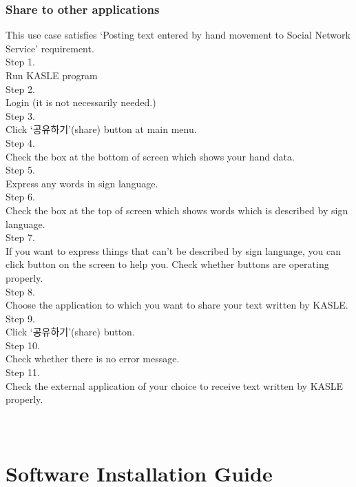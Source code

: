 \documentclass[10pt,journal,compsoc]{IEEEtran}
\begin{document}
\subsubsection{Share to other applications\\}
This use case satisfies ‘Posting text entered by hand movement to Social Network Service’ requirement.
\\Step 1.
\\Run KASLE program
\\Step 2.
\\Login (it is not necessarily needed.)
\\Step 3.
\\Click ‘공유하기’(share) button at main menu.
\\Step 4. 
\\Check the box at the bottom of screen which shows your hand data.
\\Step 5.
\\Express any words in sign language.
\\Step 6.
\\Check the box at the top of screen which shows words which is described by sign language.
\\Step 7.
\\If you want to express things that can’t be described by sign language, you can click button on the screen to help you. Check whether buttons are operating properly.
\\Step 8. 
\\Choose the application to which you want to share your text written by KASLE.
\\Step 9.
\\Click ‘공유하기’(share) button. 
\\Step 10.
\\Check whether there is no error message.
\\Step 11. 
\\Check the external application of your choice to receive text written by KASLE properly.
\\\\\\
\ifCLASSOPTIONcompsoc
{}
\else
\section{Software Installation Guide}
\label{sec:Software Installation Guide}
\fi
\end{document}
